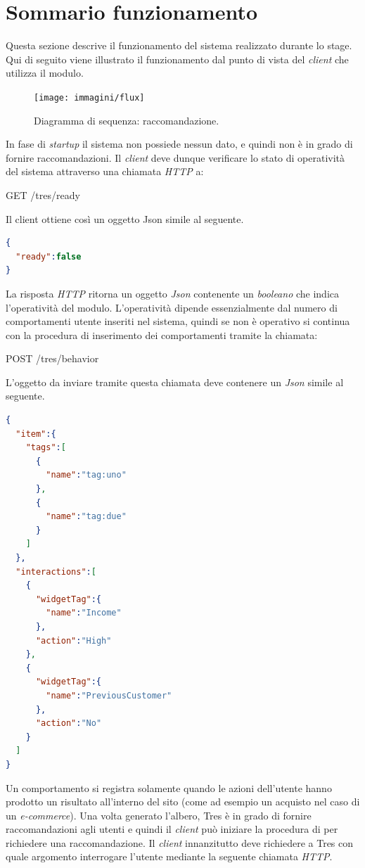 \section{Sommario funzionamento}
Questa sezione descrive il funzionamento del sistema realizzato durante lo stage. Qui di seguito viene illustrato il funzionamento dal punto di vista del \emph{client} che utilizza il modulo.
\begin{figure}[h]
\centering
\texttt{[image: immagini/flux]}
\caption{Diagramma di sequenza: raccomandazione.}
\label{fig:flux}
\end{figure}
\newpage
In fase di \emph{startup} il sistema non possiede nessun dato, e quindi non è in grado di fornire raccomandazioni.
Il \emph{client} deve dunque verificare lo stato di operatività del sistema attraverso una chiamata \emph{HTTP} a:\\
\begin{center}
GET    /tres/ready
\end{center}
Il client ottiene così un oggetto Json simile al seguente.
\begin{lstlisting}[language=json,firstnumber=1]
{
  "ready":false
}
\end{lstlisting}
La risposta \emph{HTTP} ritorna un oggetto \emph{Json} contenente un \emph{booleano} che indica l'operatività del modulo. L'operatività dipende essenzialmente dal numero di comportamenti utente inseriti nel sistema, quindi se non è operativo si continua con la procedura di inserimento dei comportamenti tramite la chiamata:
\begin{center}
POST    /tres/behavior
\end{center}
L'oggetto da inviare tramite questa chiamata deve contenere un \emph{Json} simile al seguente.
\begin{lstlisting}[language=json,firstnumber=1]
{
  "item":{
    "tags":[
      {
        "name":"tag:uno"
      },
      {
        "name":"tag:due"
      }
    ]
  },
  "interactions":[
    {
      "widgetTag":{
        "name":"Income"
      },
      "action":"High"
    },
    {
      "widgetTag":{
        "name":"PreviousCustomer"
      },
      "action":"No"
    }
  ]
}
\end{lstlisting}
Un comportamento si registra solamente quando le azioni dell'utente hanno prodotto un risultato all'interno del sito (come ad esempio un acquisto nel caso di un \emph{e-commerce}). Una volta generato l'albero, Tres è in grado di fornire raccomandazioni agli utenti e quindi il \emph{client} può iniziare la procedura di per richiedere una raccomandazione. Il \emph{client} innanzitutto deve richiedere a Tres con quale argomento interrogare l'utente mediante la seguente chiamata \emph{HTTP}. 
